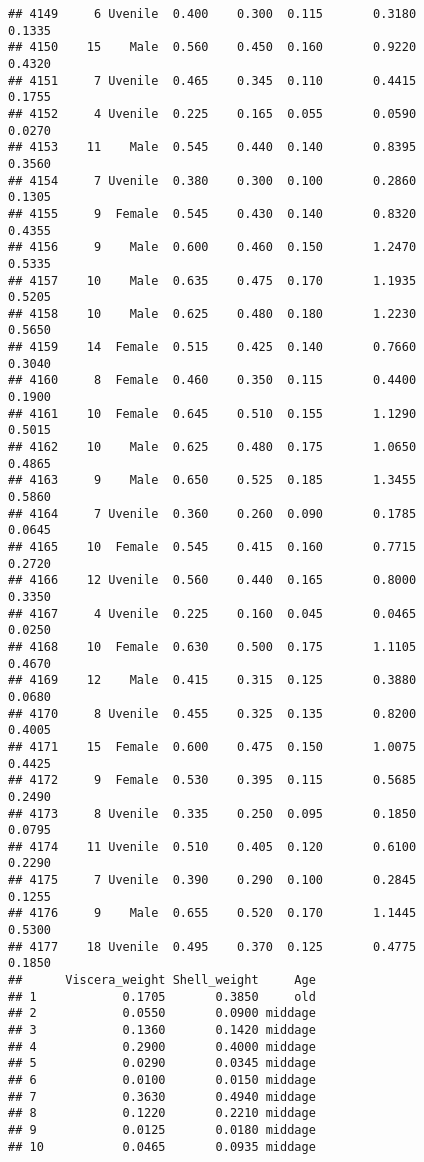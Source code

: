 \documentclass[
]{article}
\begin{document}
\begin{verbatim}
## 4149     6 Uvenile  0.400    0.300  0.115       0.3180         0.1335
## 4150    15    Male  0.560    0.450  0.160       0.9220         0.4320
## 4151     7 Uvenile  0.465    0.345  0.110       0.4415         0.1755
## 4152     4 Uvenile  0.225    0.165  0.055       0.0590         0.0270
## 4153    11    Male  0.545    0.440  0.140       0.8395         0.3560
## 4154     7 Uvenile  0.380    0.300  0.100       0.2860         0.1305
## 4155     9  Female  0.545    0.430  0.140       0.8320         0.4355
## 4156     9    Male  0.600    0.460  0.150       1.2470         0.5335
## 4157    10    Male  0.635    0.475  0.170       1.1935         0.5205
## 4158    10    Male  0.625    0.480  0.180       1.2230         0.5650
## 4159    14  Female  0.515    0.425  0.140       0.7660         0.3040
## 4160     8  Female  0.460    0.350  0.115       0.4400         0.1900
## 4161    10  Female  0.645    0.510  0.155       1.1290         0.5015
## 4162    10    Male  0.625    0.480  0.175       1.0650         0.4865
## 4163     9    Male  0.650    0.525  0.185       1.3455         0.5860
## 4164     7 Uvenile  0.360    0.260  0.090       0.1785         0.0645
## 4165    10  Female  0.545    0.415  0.160       0.7715         0.2720
## 4166    12 Uvenile  0.560    0.440  0.165       0.8000         0.3350
## 4167     4 Uvenile  0.225    0.160  0.045       0.0465         0.0250
## 4168    10  Female  0.630    0.500  0.175       1.1105         0.4670
## 4169    12    Male  0.415    0.315  0.125       0.3880         0.0680
## 4170     8 Uvenile  0.455    0.325  0.135       0.8200         0.4005
## 4171    15  Female  0.600    0.475  0.150       1.0075         0.4425
## 4172     9  Female  0.530    0.395  0.115       0.5685         0.2490
## 4173     8 Uvenile  0.335    0.250  0.095       0.1850         0.0795
## 4174    11 Uvenile  0.510    0.405  0.120       0.6100         0.2290
## 4175     7 Uvenile  0.390    0.290  0.100       0.2845         0.1255
## 4176     9    Male  0.655    0.520  0.170       1.1445         0.5300
## 4177    18 Uvenile  0.495    0.370  0.125       0.4775         0.1850
##      Viscera_weight Shell_weight     Age
## 1            0.1705       0.3850     old
## 2            0.0550       0.0900 middage
## 3            0.1360       0.1420 middage
## 4            0.2900       0.4000 middage
## 5            0.0290       0.0345 middage
## 6            0.0100       0.0150 middage
## 7            0.3630       0.4940 middage
## 8            0.1220       0.2210 middage
## 9            0.0125       0.0180 middage
## 10           0.0465       0.0935 middage

\end{verbatim}
\end{document}
